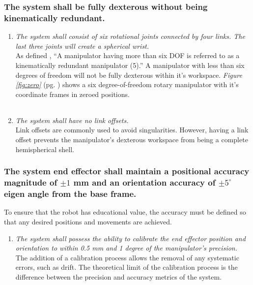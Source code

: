 \documentclass[12pt]{report}
\begin{document}
\subsubsection{The system shall be fully dexterous without being kinematically redundant.}
\begin{enumerate}[label=\thesubsubsection.\alph*,leftmargin=3cm,font=\itshape]
\item \textit{The system shall consist of six rotational joints connected by four links. The last three joints will create a spherical wrist.} \\
As defined \cite{robo}, “A manipulator having more than six DOF is referred to as a kinematically redundant manipulator (5).” A manipulator with less than six degrees of freedom will not be fully dexterous within it's workspace. \emph{Figure \ref{fig:zero}} (pg. \pageref{fig:zero}) shows a six degree-of-freedom rotary manipulator with it's coordinate frames in zeroed positions. \\
~\\
\item \textit{The system shall have no link offsets.} \\
Link offsets are commonly used to avoid singularities. However, having a link offset prevents the manipulator's dexterous workspace from being a complete hemispherical shell.
\end{enumerate}

\subsubsection{The system end effector shall maintain a positional accuracy magnitude of \(\pm 1\) mm and an orientation accuracy of \(\pm 5^{\circ}\) eigen angle from the base frame.}
To ensure that the robot has educational value, the accuracy must be defined so that any desired positions and movements are achieved.
\begin{enumerate}[label=\thesubsubsection.\alph*,leftmargin=3cm,font=\itshape]
  \item \textit{The system shall possess the ability to calibrate the end effector position and orientation to within 0.5 mm and 1 degree of the manipulator’s precision.}\\
The addition of a calibration process allows the removal of any systematic errors, such as drift. The theoretical limit of the calibration process is the difference between the precision and accuracy metrics of the system.
\end{enumerate}
\end{document}
